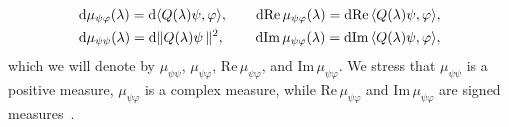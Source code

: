 \documentclass[leqno,onefignum,onetabnum]{siamltex1213}
\renewcommand{\d}{\mathrm{d}}
\newcommand\Real{\mbox{Re}\,} %
\newcommand\Imag{\mbox{Im}\,} %
\begin{document}
%
\begin{align}\label{eq:Bounded_Variation}
  &\d\mu_{\psi\varphi}(\lambda)=\d\langle Q(\lambda)\psi,\varphi\rangle, \qquad
  \d\Real\mu_{\psi\varphi}(\lambda)=\d\Real\langle Q(\lambda)\psi,\varphi\rangle,\\  
  &\d\mu_{\psi\psi}(\lambda)=\d\|Q(\lambda)\psi\,\|^2, \qquad
  \hspace{0.2em}
  \d\Imag\mu_{\psi\varphi}(\lambda)=\d\Imag\langle Q(\lambda)\psi,\varphi\rangle,
  \notag
\end{align}
%
which we will denote by $\mu_{\psi\psi}$, $\mu_{\psi\varphi}$, $\Real\mu_{\psi\varphi}$, and
$\Imag\mu_{\psi\varphi}$. We stress that $\mu_{\psi\psi}$ is a positive measure, $\mu_{\psi\varphi}$
is a complex measure, while $\Real\mu_{\psi\varphi}$ and $\Imag\mu_{\psi\varphi}$ are signed
measures~\cite{Stieltjes:1995,Stone:64}.  
\end{document}
